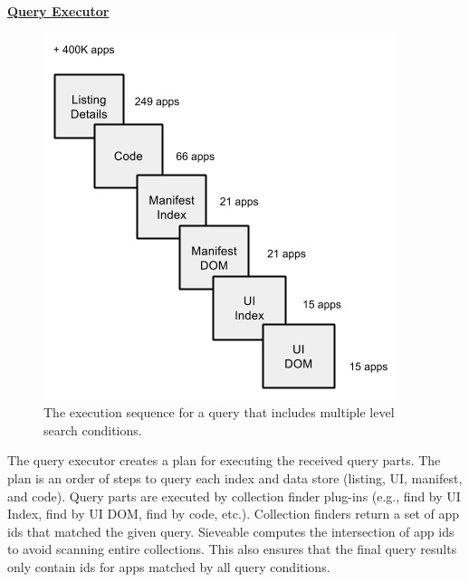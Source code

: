 \underline{\textbf{Query Executor}}
\begin{figure}
	\centering
	\includegraphics[scale=0.5]{figures/sieveable-deep-search/queryExecution.png}
	\caption{The execution sequence for a query that includes multiple level search conditions.}
	\label{fig:fig_query_execution}
\end{figure}
The query executor creates a plan for executing the received query parts.
The plan is an order of steps to query each index and data store (listing, UI, manifest, and code).
Query parts are executed by collection finder plug-ins (e.g., find by UI Index, find by UI DOM, find by code, etc.).
Collection finders return a set of app ids that matched the given query.
Sieveable computes the intersection of app ids to avoid scanning entire collections.
This also ensures that the final query results only contain ids for apps matched by all query conditions.


